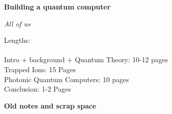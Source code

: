 \documentclass[a4paper]{article}
\begin{document}
\begin{center}
    \Huge \textbf{Building a quantum computer}
\end{center}
\vspace{-1em}

\begin{center}
    \emph{\large All of us}
\end{center}
\vspace{0.5em}
Lengths:\\ \\
Intro + background + Quantum Theory: 10-12 pages\\
Trapped Ions: 15 Pages\\
Photonic Quantum Computers: 10 pages\\
Conclusion: 1-2 Pages\\











\begin{center}
    \Huge \textbf{Old notes and scrap space}
\end{center}
\vspace{-1em}




\printbibliography
\end{document}
